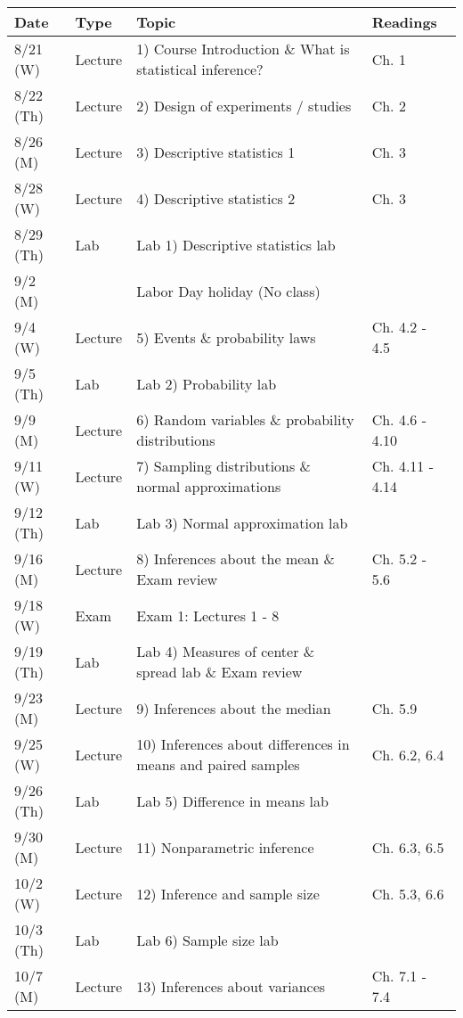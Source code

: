 \documentclass{article}
\begin{document}
\begin{center}
	\begin{tabular}{|p{2cm}|p{1.5cm}|p{9cm}|p{2.8cm}|}
		\hline
		Date & Type & Topic & Readings \\ \hline \hline
		8/21 (W) & Lecture & 1) Course Introduction \& What is statistical inference? & Ch. 1 \\ \hline
		8/22 (Th) & Lecture & 2) Design of experiments / studies & Ch. 2 \\ \hline
		8/26 (M) & Lecture & 3) Descriptive statistics 1 & Ch. 3 \\ \hline
		8/28 (W) & Lecture & 4) Descriptive statistics 2 & Ch. 3 \\ \hline
		8/29 (Th) & Lab & Lab 1) Descriptive statistics lab & \\ \hline
		9/2 (M) & & Labor Day holiday (No class) & \\ \hline
		9/4 (W) & Lecture & 5) Events \& probability laws & Ch. 4.2 - 4.5 \\ \hline
		9/5 (Th) & Lab & Lab 2) Probability lab & \\ \hline
		9/9 (M) & Lecture & 6) Random variables \& probability distributions & Ch. 4.6 - 4.10 \\ \hline
		9/11 (W) & Lecture &  7) Sampling distributions \& normal approximations & Ch. 4.11 - 4.14 \\ \hline
		9/12 (Th) & Lab & Lab 3) Normal approximation lab & \\ \hline
		9/16 (M) & Lecture & 8) Inferences about the mean \& Exam review & Ch. 5.2 - 5.6 \\ \hline
		9/18 (W) & Exam & Exam 1: Lectures 1 - 8 & \\ \hline
		9/19 (Th) & Lab & Lab 4) Measures of center \& spread lab \& Exam review & \\ \hline
		9/23 (M) & Lecture & 9) Inferences about the median & Ch. 5.9 \\ \hline
		9/25 (W) & Lecture & 10) Inferences about differences in means and paired samples & Ch. 6.2, 6.4 \\ \hline
		9/26 (Th) & Lab & Lab 5) Difference in means lab & \\ \hline 
		9/30 (M) & Lecture &  11) Nonparametric inference & Ch. 6.3, 6.5 \\ \hline
		10/2 (W) & Lecture & 12) Inference and sample size & Ch. 5.3, 6.6 \\ \hline
		10/3 (Th) & Lab & Lab 6) Sample size lab & \\ \hline 
		10/7 (M) & Lecture & 13) Inferences about variances & Ch. 7.1 - 7.4 \\ \hline

\end{tabular}
\end{center}
\end{document}
